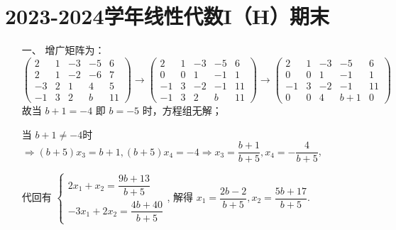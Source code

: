 \section{2023-2024学年线性代数I（H）期末}
\begin{enumerate}
    \item[一、]增广矩阵为：
    \[
    \left(\begin{array}{cccc|c}
    2 & 1 & -3 & -5 & 6 \\
    2 & 1 & -2 & -6 & 7 \\
    -3 & 2 & 1 & 4 & 5 \\
    -1 & 3 & 2 & b & 11
    \end{array}\right) \to
    \left(\begin{array}{cccc|c}
    2 & 1 & -3 & -5 & 6 \\
    0 & 0 & 1 & -1 & 1 \\
    -1 & 3 & -2 & -1 & 11 \\
    -1 & 3 & 2 & b & 11
    \end{array}\right) \to
    \left(\begin{array}{cccc|c}
    2 & 1 & -3 & -5 & 6 \\
    0 & 0 & 1 & -1 & 1 \\
    -1 & 3 & -2 & -1 & 11 \\
    0 & 0 & 4 & b+1 & 0
    \end{array}\right)
    \]
    故当 \(b+1=-4\) 即 \(b=-5\) 时，方程组无解；\par
    当 \(b+1\neq -4\)时 \(\Rightarrow \left(b+5\right)x_3=b+1,\left(b+5\right)x_4=-4 \Rightarrow x_3=\dfrac{b+1}{b+5},x_4=-\dfrac{4}{b+5}\),\par
    代回有 \(
            \begin{cases}
                2x_1+x_2=\dfrac{9b+13}{b+5}\\
                -3x_1+2x_2=\dfrac{4b+40}{b+5}
            \end{cases}
            \),
    解得 \(x_1=\dfrac{2b-2}{b+5},x_2=\dfrac{5b+17}{b+5}\).\par


\end{enumerate}
